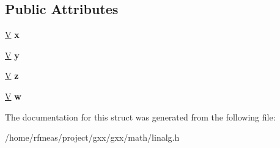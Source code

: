 \subsection*{Public Attributes}
\begin{DoxyCompactItemize}
\item 
\hyperlink{structlinalg_1_1vec}{V} {\bfseries x}\hypertarget{structlinalg_1_1mat_3_01T_00_01M_00_014_01_4_a82a43f0fe36689ede14ffef52b40d802}{}\label{structlinalg_1_1mat_3_01T_00_01M_00_014_01_4_a82a43f0fe36689ede14ffef52b40d802}

\item 
\hyperlink{structlinalg_1_1vec}{V} {\bfseries y}\hypertarget{structlinalg_1_1mat_3_01T_00_01M_00_014_01_4_a082e54788b4c6c8ee80228776870dcfd}{}\label{structlinalg_1_1mat_3_01T_00_01M_00_014_01_4_a082e54788b4c6c8ee80228776870dcfd}

\item 
\hyperlink{structlinalg_1_1vec}{V} {\bfseries z}\hypertarget{structlinalg_1_1mat_3_01T_00_01M_00_014_01_4_a3847f070990d6084bcb463135beb850c}{}\label{structlinalg_1_1mat_3_01T_00_01M_00_014_01_4_a3847f070990d6084bcb463135beb850c}

\item 
\hyperlink{structlinalg_1_1vec}{V} {\bfseries w}\hypertarget{structlinalg_1_1mat_3_01T_00_01M_00_014_01_4_a7588d56221ba8ce5d80beaf7f8378883}{}\label{structlinalg_1_1mat_3_01T_00_01M_00_014_01_4_a7588d56221ba8ce5d80beaf7f8378883}

\end{DoxyCompactItemize}


The documentation for this struct was generated from the following file\+:\begin{DoxyCompactItemize}
\item 
/home/rfmeas/project/gxx/gxx/math/linalg.\+h\end{DoxyCompactItemize}
